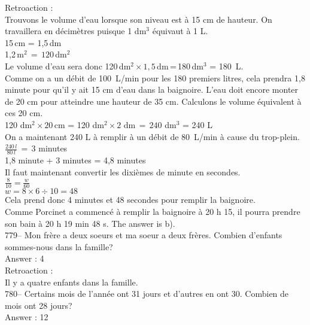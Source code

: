 ﻿\documentclass[letterpaper, 12pt]{article}
\begin{document}
Retroaction : \\
Trouvons le volume d'eau lorsque son niveau est \`a 15 cm de hauteur. On
travaillera en d\'ecim\`etres puisque 1 dm$^{3}$ \'equivaut \`a 1 L.\\
15\,cm = 1,5\,dm\\
1,2\,m$^{2}\,=\,120$\,dm$^{2}$\\
Le volume d'eau sera donc 120\,dm$^{2}\times1,5$\,dm\,=\,180\,dm$^{3}$ =
180~L.\\

Comme on a un d\'ebit de 100~L/min pour les 180 premiers litres,  cela
prendra 1,8 minute pour qu'il y ait 15 cm d'eau dans la baignoire. L'eau
doit encore monter de 20 cm pour atteindre une hauteur de 35 cm. Calculons
le volume \'equivalent \`a ces 20 cm.\\

120 dm$^{2}\times 20$\,cm = 120 dm$^{2}\times 2$ dm$\,=\,240$ dm$^{3}$ = 240
L\\[2mm]
On a maintenant 240 L \`a remplir \`a un d\'ebit de 80~L/min \`a cause du
trop-plein.\\[2mm]
$\frac{240\,l}{80\,l}\,=\,3$ minutes\\[2mm]
1,8 minute + 3 minutes = 4,8 minutes\\[2mm]
Il faut maintenant convertir les dixi\`emes de minute en secondes.\\[2mm]
$\frac{8}{10}=\frac{w}{60}$\\[2mm]
$w=8\times6\div10=48$\\[2mm]
Cela prend donc 4 minutes et 48 secondes pour remplir la
baignoire.\\[2mm]
Comme Porcinet a commenc\'e \`a remplir la baignoire \`a 20 h 15, il pourra
prendre son bain \`a 20 h 19 min 48 s.  The answer is b).\\

779-- Mon fr\`ere a deux soeurs et ma soeur a deux fr\`eres.  Combien
d'enfants sommes-nous dans la famille?\\

Answer : 4\\

Retroaction : \\
Il y a quatre enfants dans la famille.\\

780-- Certains mois de l'ann\'ee ont 31 jours et d'autres en ont 30.
Combien de mois ont 28 jours?\\

Answer : 12\\
\end{document}
